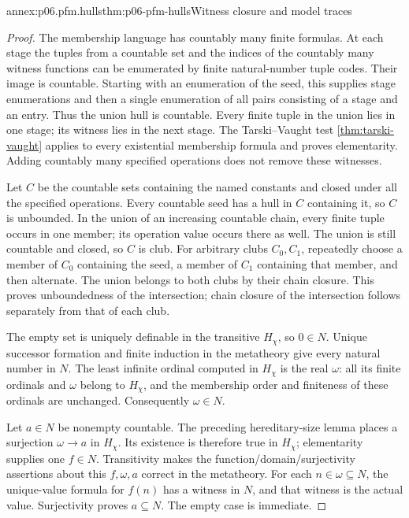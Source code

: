 \begin{annexitem}{annex:p06.pfm.hulls}{thm:p06-pfm-hulls}{Witness closure and model traces}
\begin{proof}
The membership language has countably many finite formulas.
At each stage the tuples from a countable set and the indices of the
countably many witness functions can be enumerated by finite natural-number
tuple codes. Their image is countable. Starting with an enumeration of the
seed, this supplies stage enumerations and then a single enumeration of
all pairs consisting of a stage and an entry. Thus the union hull is
countable. Every finite tuple in the union lies in one stage; its witness
lies in the next stage. The Tarski--Vaught test
\cref{thm:tarski-vaught} applies to every existential membership formula
and proves elementarity. Adding countably many specified operations
does not remove these witnesses.

Let \(C\) be the countable sets containing the named constants and closed
under all the specified operations. Every countable seed has a hull in
\(C\) containing it, so \(C\) is unbounded. In the union of an increasing
countable chain, every finite tuple occurs in one member; its operation
value occurs there as well. The union is still countable and closed,
so \(C\) is club.
For arbitrary clubs \(C_0,C_1\), repeatedly choose a member of \(C_0\)
containing the seed, a member of \(C_1\) containing that member, and then
alternate. The union belongs to both clubs by their chain closure.
This proves unboundedness of the intersection; chain closure of the
intersection follows separately from that of each club.

The empty set is uniquely definable in the transitive \(H_\chi\),
so \(0\in N\). Unique successor formation and finite induction in the
metatheory give every natural number in \(N\).
The least infinite ordinal computed in \(H_\chi\) is the real \(\omega\):
all its finite ordinals and \(\omega\) belong to \(H_\chi\), and the
membership order and finiteness of these ordinals are unchanged.
Consequently \(\omega\in N\).

Let \(a\in N\) be nonempty countable. The preceding hereditary-size lemma
places a surjection \(\omega\to a\) in \(H_\chi\).
Its existence is therefore true in \(H_\chi\); elementarity supplies one
\(f\in N\). Transitivity makes the function/domain/surjectivity assertions
about this \(f,\omega,a\) correct in the metatheory.
For each \(n\in\omega\subseteq N\), the unique-value formula for \(f(n)\)
has a witness in \(N\), and that witness is the actual value.
Surjectivity proves \(a\subseteq N\). The empty case is immediate.


\end{proof}
\end{annexitem}
